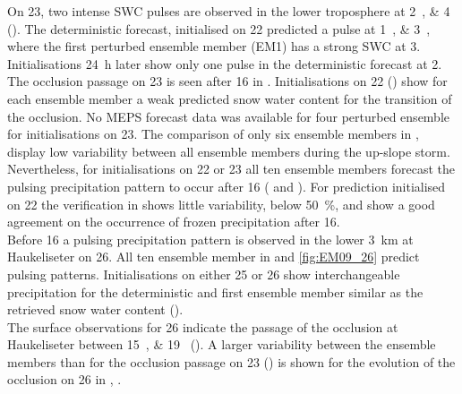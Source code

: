 On \SI{23}{\dec}, two intense SWC pulses are observed in the lower troposphere at \SIlist{2;4}{\UTC} (). The deterministic forecast, initialised on \SI{22}{\dec} predicted a pulse at \SIlist{1;3}{\UTC}, where the first perturbed ensemble member (EM1) has a strong SWC at \SI{3}{\UTC}. Initialisations \SI{24}{\hour} later show only one pulse in the deterministic forecast at \SI{2}{\UTC}.
\\
The occlusion passage on \SI{23}{\dec} is seen after \SI{16}{\UTC} in .  
% 
Initialisations on \SI{22}{\dec} () show for each ensemble member a weak predicted snow water content for the transition of the occlusion. 
No MEPS forecast data was available for four perturbed ensemble for initialisations on \SI{23}{\dec}.
The comparison of only six ensemble members %
in , display low variability between all ensemble members during the up-slope storm. %
Nevertheless, for initialisations on \num{22} or \SI{23}{\dec} all ten ensemble members forecast the pulsing precipitation pattern to occur after \SI{16}{\UTC} ( and ). 
For prediction initialised on \SI{22}{\dec} the verification in  shows little variability, below \SI{50}{\percent}, and show a good agreement on the occurrence of frozen precipitation after \SI{16}{\UTC}. 
\\
Before \SI{16}{\UTC} a pulsing precipitation pattern is observed in the lower \SI{3}{\km} at Haukeliseter on \SI{26}{\dec}. All ten ensemble member in  and \ref{fig:EM09_26} predict pulsing patterns. Initialisations on either \num{25} or \SI{26}{\dec} show interchangeable precipitation for the deterministic and first ensemble member similar as the retrieved snow water content (). 
\\
The surface observations for \SI{26}{\dec} indicate the passage of the occlusion at Haukeliseter between \SIlist{15;19}{\UTC} (). A larger variability between the ensemble members than for the occlusion passage on \SI{23}{\dec} ()  is shown for the evolution of the occlusion on \SI{26}{\dec} in , .  
